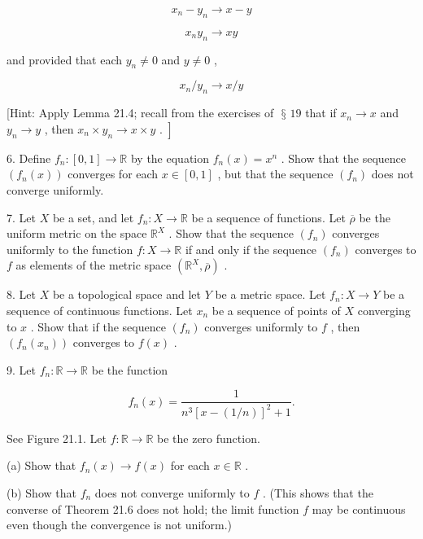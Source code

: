 \documentclass[10pt]{article}
\begin{document}
\[
{x}_{n} - {y}_{n} \rightarrow  x - y
\]

\[
{x}_{n}{y}_{n} \rightarrow  {xy}
\]

and provided that each \({y}_{n} \neq  0\) and \(y \neq  0\) ,

\[
{x}_{n}/{y}_{n} \rightarrow  x/y
\]

[Hint: Apply Lemma 21.4; recall from the exercises of \(\text{ § }{19}\) that if \({x}_{n} \rightarrow  x\) and \({y}_{n} \rightarrow  y\) , then \(\left. {{x}_{n} \times  {y}_{n} \rightarrow  x \times  y\text{ . }}\right\rbrack\)

6. Define \({f}_{n} : \left\lbrack  {0,1}\right\rbrack   \rightarrow  \mathbb{R}\) by the equation \({f}_{n}\left( x\right)  = {x}^{n}\) . Show that the sequence \(\left( {{f}_{n}\left( x\right) }\right)\) converges for each \(x \in  \left\lbrack  {0,1}\right\rbrack\) , but that the sequence \(\left( {f}_{n}\right)\) does not converge uniformly.

7. Let \(X\) be a set, and let \({f}_{n} : X \rightarrow  \mathbb{R}\) be a sequence of functions. Let \(\overline{\rho }\) be the uniform metric on the space \({\mathbb{R}}^{X}\) . Show that the sequence \(\left( {f}_{n}\right)\) converges uniformly to the function \(f : X \rightarrow  \mathbb{R}\) if and only if the sequence \(\left( {f}_{n}\right)\) converges to \(f\) as elements of the metric space \(\left( {{\mathbb{R}}^{X},\overline{\rho }}\right)\) .

8. Let \(X\) be a topological space and let \(Y\) be a metric space. Let \({f}_{n} : X \rightarrow  Y\) be a sequence of continuous functions. Let \({x}_{n}\) be a sequence of points of \(X\) converging to \(x\) . Show that if the sequence \(\left( {f}_{n}\right)\) converges uniformly to \(f\) , then \(\left( {{f}_{n}\left( {x}_{n}\right) }\right)\) converges to \(f\left( x\right)\) .

9. Let \({f}_{n} : \mathbb{R} \rightarrow  \mathbb{R}\) be the function

\[
{f}_{n}\left( x\right)  = \frac{1}{{n}^{3}{\left\lbrack  x - \left( 1/n\right) \right\rbrack  }^{2} + 1}.
\]

See Figure 21.1. Let \(f : \mathbb{R} \rightarrow  \mathbb{R}\) be the zero function.

(a) Show that \({f}_{n}\left( x\right)  \rightarrow  f\left( x\right)\) for each \(x \in  \mathbb{R}\) .

(b) Show that \({f}_{n}\) does not converge uniformly to \(f\) . (This shows that the converse of Theorem 21.6 does not hold; the limit function \(f\) may be continuous even though the convergence is not uniform.)
\end{document}
